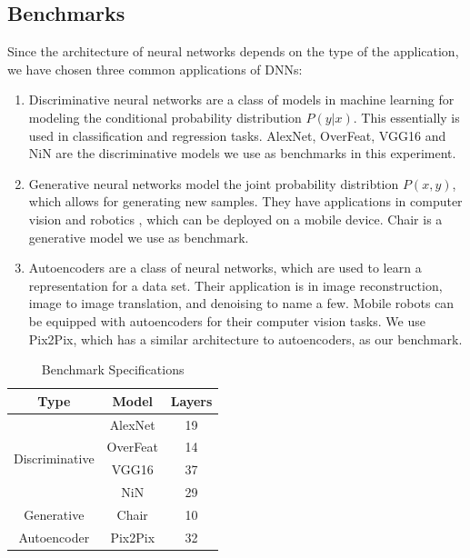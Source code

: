 \documentclass[conference,9pt]{IEEEtran}
\begin{document}
\subsection{Benchmarks}
Since the architecture of neural networks depends on the type of the application, we have chosen three common applications of DNNs:
\begin{enumerate}
\item Discriminative neural networks are a class of models in machine learning for modeling the conditional probability distribution $P(y|x)$. This essentially is used in classification and regression tasks. AlexNet\cite{b1}, OverFeat\cite{b23}, VGG16\cite{b24} and NiN\cite{b22} are the discriminative models we use as benchmarks in this experiment.
\item Generative neural networks model the joint probability distribtion $P(x,y)$, which allows for generating new samples. They have applications in computer vision\cite{b19} and robotics \cite{b15}, which can be deployed on a mobile device. Chair\cite{b25} is a generative model we use as benchmark.
\item Autoencoders are a class of neural networks, which are used to learn a representation for a data set. Their application is in image reconstruction,  image to image translation, and denoising to name a few. Mobile robots can be equipped with autoencoders for their computer vision tasks. We use Pix2Pix\cite{b25}, which has a similar architecture to autoencoders, as our benchmark.
\end{enumerate}

\begin{table}[h]
    \caption{Benchmark Specifications}
\centering
     \begin{adjustbox}{center}
        \begin{tabular}{|c|c|c|}
        \hline
        \textbf Type & \textbf Model & \textbf Layers \\                
            \hline
            \multirow{4}{*}{Discriminative} & \multicolumn{1}{c}{AlexNet} & \multicolumn{1}{|c|}{19} \\\cline{2-3}
                                 & \multicolumn{1}{c}{OverFeat} & \multicolumn{1}{|c|}{14} \\\cline{2-3}
                                 & \multicolumn{1}{c}{VGG16} & \multicolumn{1}{|c|}{37} \\\cline{2-3}
                                 & \multicolumn{1}{c}{NiN} & \multicolumn{1}{|c|}{29} \\\hline
           Generative & Chair & 10 \\                \hline
            Autoencoder &  Pix2Pix & 32 \\                \hline
        \end{tabular}
     \end{adjustbox}

    \label{benchmarks}
\end{table}
\end{document}
